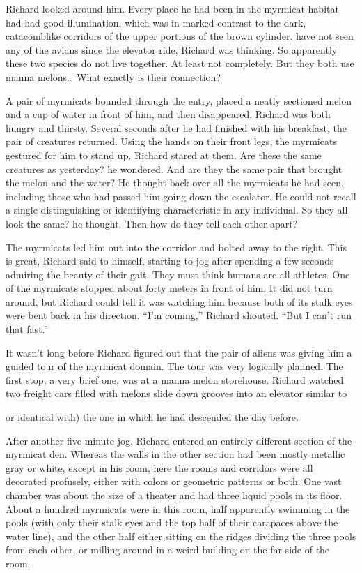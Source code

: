 \documentclass[]{article}
\begin{document}
{Richard looked around him.  Every place he had been in the myrmicat habitat had had good illumination, which was in marked contrast to the dark, catacomblike corridors of the upper portions of the brown cylinder.  have not seen any of the avians since the elevator ride, Richard was thinking.  So apparently these two species do not live together.  At least not completely.  But they both use manna melons…  What exactly is their connection?

A pair of myrmicats bounded through the entry, placed a neatly sectioned melon and a cup of water in front of him, and then disappeared.  Richard was both hungry and thirsty.  Several seconds after he had finished with his breakfast, the pair of creatures returned.  Using the hands on their front legs, the myrmicats gestured for him to stand up.  Richard stared at them.  Are these the same creatures as yesterday? he wondered.  And are they the same pair that brought the melon and the water? He thought back over all the myrmicats he had seen, including those who had passed him going down the escalator.  He could not recall a single distinguishing or identifying characteristic in any individual.  So they all look the same? he thought.  Then how do they tell each other apart?

The myrmicats led him out into the corridor and bolted away to the right.  This is great, Richard said to himself, starting to jog after spending a few seconds admiring the beauty of their gait.  They must think humans are all athletes.  One of the myrmicats stopped about forty meters in front of him.  It did not turn around, but Richard could tell it was watching him because both of its stalk eyes were bent back in his direction.  “I’m coming,” Richard shouted.  “But I can’t run that fast.”

It wasn’t long before Richard figured out that the pair of aliens was giving him a guided tour of the myrmicat domain.  The tour was very logically planned.  The first stop, a very brief one, was at a manna melon storehouse.  Richard watched two freight cars filled with melons slide down grooves into an elevator similar to {or identical with) the one in which he had descended the day before.
	
After another five-minute jog, Richard entered an entirely different section of the myrmicat den.  Whereas the walls in the other section had been mostly metallic gray or white, except in his room, here the rooms and corridors were all decorated profusely, either with colors or geometric patterns or both.  One vast chamber was about the size of a theater and had three liquid pools in its floor.  About a hundred myrmicats were in this room, half apparently swimming in the pools (with only their stalk eyes and the top half of their carapaces above the water line), and the other half either sitting on the ridges dividing the three pools from each other, or milling around in a weird building on the far side of the room.

}}
\end{document}
